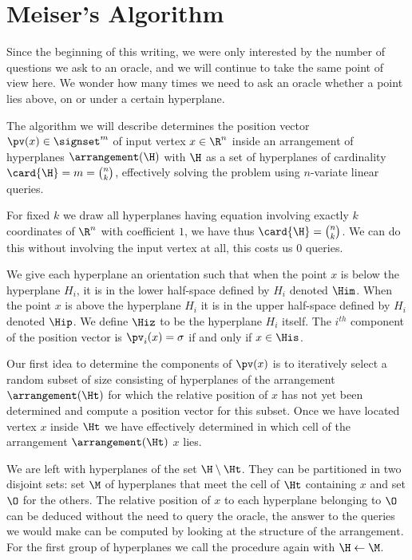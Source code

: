 \section{Meiser's Algorithm}


Since the beginning of this writing, we were only interested by the number of
questions we ask to an oracle, and we will continue to take the same point of
view here. We wonder how many times we need to ask an oracle whether a point
lies above, on or under a certain hyperplane.

The algorithm we will describe determines the position vector $\pv(x) \in
\signset^{m}$ of input vertex $x \in \R^n$ inside an
arrangement of hyperplanes $\arrangement(\H)$ with $\H$ as a set of hyperplanes
of cardinality $\card{\H} = m = \binom{n}{k}$,
effectively solving the \kSUM problem using  $n$-variate
linear queries.

For fixed $k$ we draw all hyperplanes having equation involving exactly $k$
coordinates of $\R^n$ with coefficient $1$, we have thus $\card{\H} =
\binom{n}{k}$. We can do this without involving the input vertex at all, this
costs us $0$ queries.

We give each hyperplane an orientation such that when the point $x$ is below
the
hyperplane $H_i$, it is in the lower half-space defined by $H_i$ denoted
$\Him$. When the point $x$ is above the hyperplane $H_i$ it is in the upper
half-space defined by $H_i$ denoted $\Hip$. We define $\Hiz$ to be the
hyperplane $H_i$ itself. The $i^{th}$ component of the position vector is
$\pv_i(x) = \sigma$ if and only if $x \in \His$.

Our first idea to determine the components of $\pv(x)$ is to iteratively
select a random subset of size  consisting of hyperplanes of the
arrangement $\arrangement(\Ht)$ for which the relative position of $x$ has not yet been
determined and compute a position vector for this subset. Once we have located
vertex $x$ inside $\Ht$ we have effectively determined in
which cell of the arrangement $\arrangement(\Ht)$ $x$ lies.

We are left with hyperplanes of the set $\H \setminus \Ht$. They can be
partitioned in two disjoint sets: set $\M$ of hyperplanes that meet the cell of
$\Ht$ containing $x$ and set $\O$ for the others. The relative position of $x$
to each hyperplane belonging to $\O$ can be deduced without the need to query
the oracle, the answer to the queries we would make can be computed by looking
at the structure of the arrangement. For the first group of hyperplanes
we call the procedure again with $\H \gets \M$.


